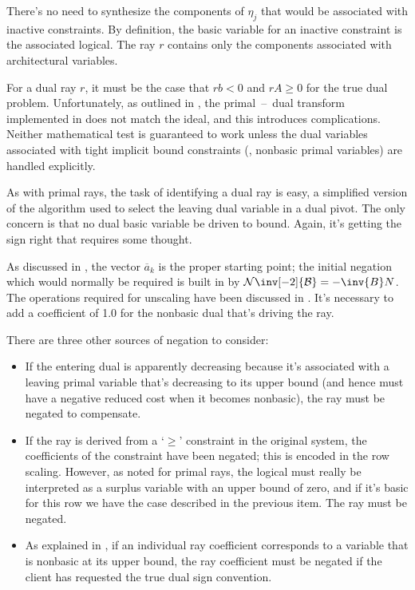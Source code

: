There's no need to synthesize the components of $\eta_j$ that would be
associated with inactive constraints.
By definition, the basic variable for an inactive constraint is the associated
logical.
The ray $r$ contains only the components associated with architectural
variables.

For a dual ray $r$, it must be the case that $rb < 0$ and $rA \geq 0$ for the
true dual problem.
Unfortunately, as outlined in , the primal~--~dual
transform implemented in \dylp does not match the ideal, and this introduces
complications.
Neither mathematical test is guaranteed to work unless the dual variables
associated with tight implicit bound constraints (\ie, nonbasic primal
variables) are handled explicitly.

As with primal rays, the task of identifying a dual ray is easy, a simplified
version of the algorithm used to select the leaving dual variable in a dual
pivot.
The only concern is that no dual basic variable be driven to bound.
Again, it's getting the sign right that requires some thought.

As discussed in , the vector $\overline{a}_k$ is the
proper starting point; the initial negation which would normally be required is
built in by $\mathcal{N}\inv[-2]{\mathcal{B}} = -\inv{B}N$.
The operations required for unscaling have been discussed in
.
It's necessary to add a coefficient of 1.0 for the nonbasic dual that's
driving the ray.

There are three other sources of negation to consider:
\begin{itemize}
  \item
  If the entering dual is apparently decreasing because it's associated with a
  leaving primal variable that's decreasing to its upper bound (and hence
  must have a
  negative reduced cost when it becomes nonbasic), the ray must be negated
  to compensate.

  \item
  If the ray is derived from a `$\geq$' constraint in the original system,
  the coefficients of the constraint have been negated; this is encoded in the
  row scaling.
  However, as noted for primal rays, the logical must really be interpreted as
  a surplus variable with an upper bound of zero, and if it's basic for this
  row we have the case described in the previous item.
  The ray must be negated.

  \item
  As explained in ,
  if an individual ray coefficient corresponds to a variable that is nonbasic
  at its upper bound, the ray coefficient must be negated if the client has
  requested the true dual sign convention.
\end{itemize}

